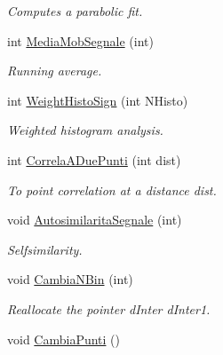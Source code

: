 \begin{DoxyCompactItemize}
\begin{DoxyCompactList}\small\item\em Computes a parabolic fit. \end{DoxyCompactList}\item 
int \hyperlink{classVarDatFile_af61093b90aceaaeaabfaf6364db43abf}{Media\+Mob\+Segnale} (int)\hypertarget{classVarDatFile_af61093b90aceaaeaabfaf6364db43abf}{}\label{classVarDatFile_af61093b90aceaaeaabfaf6364db43abf}

\begin{DoxyCompactList}\small\item\em Running average. \end{DoxyCompactList}\item 
int \hyperlink{classVarDatFile_ad6521d627ba809d5e253cefcd5090491}{Weight\+Histo\+Sign} (int N\+Histo)
\begin{DoxyCompactList}\small\item\em Weighted histogram analysis. \end{DoxyCompactList}\item 
int \hyperlink{classVarDatFile_aa6212bdcf240e866f234a41d6b98a224}{Correla\+A\+Due\+Punti} (int dist)\hypertarget{classVarDatFile_aa6212bdcf240e866f234a41d6b98a224}{}\label{classVarDatFile_aa6212bdcf240e866f234a41d6b98a224}

\begin{DoxyCompactList}\small\item\em To point correlation at a distance dist. \end{DoxyCompactList}\item 
void \hyperlink{classVarDatFile_ae1058d878c5370add56411e3998b9d51}{Autosimilarita\+Segnale} (int)\hypertarget{classVarDatFile_ae1058d878c5370add56411e3998b9d51}{}\label{classVarDatFile_ae1058d878c5370add56411e3998b9d51}

\begin{DoxyCompactList}\small\item\em Selfsimilarity. \end{DoxyCompactList}\item 
void \hyperlink{classVarDatFile_af0b16f63863e97d7c86f9ac00e67f11b}{Cambia\+N\+Bin} (int)\hypertarget{classVarDatFile_af0b16f63863e97d7c86f9ac00e67f11b}{}\label{classVarDatFile_af0b16f63863e97d7c86f9ac00e67f11b}

\begin{DoxyCompactList}\small\item\em Reallocate the pointer d\+Inter d\+Inter1. \end{DoxyCompactList}\item 
void \hyperlink{classVarDatFile_ad399f5baf6ac6cda47416f07b69b3ca8}{Cambia\+Punti} ()\hypertarget{classVarDatFile_ad399f5baf6ac6cda47416f07b69b3ca8}{}\label{classVarDatFile_ad399f5baf6ac6cda47416f07b69b3ca8}


\end{DoxyCompactItemize}
